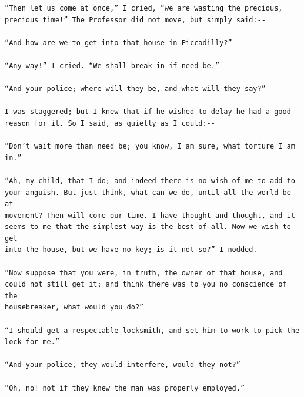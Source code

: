 \documentclass{article}
\begin{document}
\begin{verbatim}
“Then let us come at once,” I cried, “we are wasting the precious,
precious time!” The Professor did not move, but simply said:--

“And how are we to get into that house in Piccadilly?”

“Any way!” I cried. “We shall break in if need be.”

“And your police; where will they be, and what will they say?”

I was staggered; but I knew that if he wished to delay he had a good
reason for it. So I said, as quietly as I could:--

“Don’t wait more than need be; you know, I am sure, what torture I am
in.”

“Ah, my child, that I do; and indeed there is no wish of me to add to
your anguish. But just think, what can we do, until all the world be at
movement? Then will come our time. I have thought and thought, and it
seems to me that the simplest way is the best of all. Now we wish to get
into the house, but we have no key; is it not so?” I nodded.

“Now suppose that you were, in truth, the owner of that house, and
could not still get it; and think there was to you no conscience of the
housebreaker, what would you do?”

“I should get a respectable locksmith, and set him to work to pick the
lock for me.”

“And your police, they would interfere, would they not?”

“Oh, no! not if they knew the man was properly employed.”


\end{verbatim}
\end{document}
